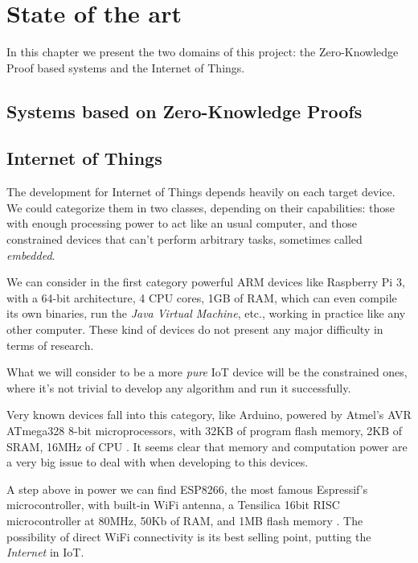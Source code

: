 \chapter{State of the art}\label{ch:stateoftheart}

In this chapter we present the two domains of this project: the Zero-Knowledge Proof based systems and the Internet of Things.


\section{Systems based on Zero-Knowledge Proofs}



\section{Internet of Things}

The development for Internet of Things depends heavily on each target device. We could categorize them in two classes, depending on their capabilities: those with enough processing power to act like an usual computer, and those constrained devices that can't perform arbitrary tasks, sometimes called \textit{embedded}.


We can consider in the first category powerful ARM devices like Raspberry Pi 3, with a 64-bit architecture, 4 CPU cores, 1GB of RAM, which can even compile its own binaries, run the \textit{Java Virtual Machine}, etc., working in practice like any other computer. These kind of devices do not present any major difficulty in terms of research.

What we will consider to be a more \textit{pure} \ac{IoT} device will be the constrained ones, where it's not trivial to develop any algorithm and run it successfully.

Very known devices fall into this category, like Arduino, powered by Atmel's AVR ATmega328 8-bit microprocessors, with 32KB of program flash memory, 2KB of SRAM, 16MHz of CPU \citep{ATmega328}. It seems clear that memory and computation power are a very big issue to deal with when developing to this devices.

A step above in power we can find ESP8266, the most famous Espressif's microcontroller, with built-in WiFi antenna, a Tensilica 16bit RISC microcontroller at 80MHz, 50Kb of RAM, and 1MB flash memory \citep{ESP8266}. The possibility of direct WiFi connectivity is its best selling point, putting the \textit{Internet} in \acl{IoT}.


